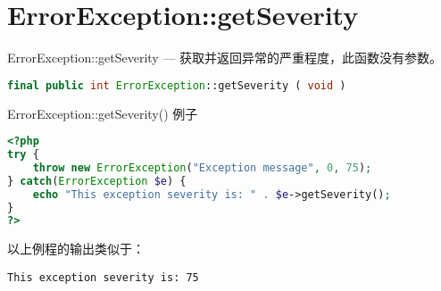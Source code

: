 \section{ErrorException::getSeverity}

ErrorException::getSeverity — 获取并返回异常的严重程度，此函数没有参数。


\begin{lstlisting}[language=PHP]
final public int ErrorException::getSeverity ( void )
\end{lstlisting}


\begin{example}
ErrorException::getSeverity() 例子
\begin{lstlisting}[language=PHP]
<?php
try {
    throw new ErrorException("Exception message", 0, 75);
} catch(ErrorException $e) {
    echo "This exception severity is: " . $e->getSeverity();
}
?>
\end{lstlisting}
\end{example}

以上例程的输出类似于：

\begin{verbatim}
This exception severity is: 75
\end{verbatim}











\clearpage
